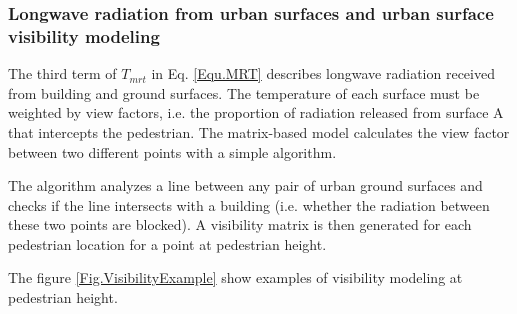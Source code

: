 \documentclass[preprint,3p,12pt,english]{elsarticle}
\begin{document}
\subsubsection{Longwave radiation from urban surfaces and urban surface visibility modeling}

The third term of $T_{mrt}$ in Eq. \ref{Equ.MRT} describes longwave radiation received from building and ground surfaces. The temperature of each surface must be weighted by view factors, i.e. the proportion of radiation released from surface A that intercepts the pedestrian. The matrix-based model calculates the view factor between two different points with a simple algorithm.

The algorithm analyzes a line between any pair of urban ground surfaces  and checks if the line intersects with a building (i.e. whether the radiation between these two points are blocked). A visibility matrix is then generated for each pedestrian location for a point at pedestrian height. 

The figure \ref{Fig.VisibilityExample} show examples of visibility modeling at pedestrian height.
\end{document}
